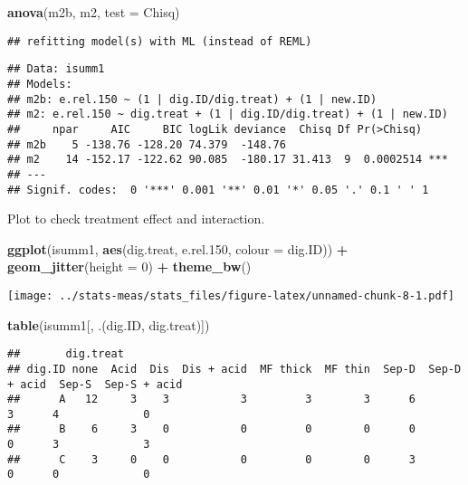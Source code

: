 \documentclass[
]{article}
\newenvironment{Shaded}{\begin{snugshade}}{\end{snugshade}}
\newcommand{\AttributeTok}[1]{\textcolor[rgb]{0.13,0.29,0.53}{#1}}
\newcommand{\DecValTok}[1]{\textcolor[rgb]{0.00,0.00,0.81}{#1}}
\newcommand{\FloatTok}[1]{\textcolor[rgb]{0.00,0.00,0.81}{#1}}
\newcommand{\FunctionTok}[1]{\textcolor[rgb]{0.13,0.29,0.53}{\textbf{#1}}}
\newcommand{\NormalTok}[1]{#1}
\newcommand{\SpecialCharTok}[1]{\textcolor[rgb]{0.81,0.36,0.00}{\textbf{#1}}}
\newcommand{\StringTok}[1]{\textcolor[rgb]{0.31,0.60,0.02}{#1}}
\begin{document}
\begin{Shaded}
\begin{Highlighting}[]
\FunctionTok{anova}\NormalTok{(m2b, m2, }\AttributeTok{test =} \StringTok{\textquotesingle{}Chisq\textquotesingle{}}\NormalTok{)}
\end{Highlighting}
\end{Shaded}

\begin{verbatim}
## refitting model(s) with ML (instead of REML)
\end{verbatim}

\begin{verbatim}
## Data: isumm1
## Models:
## m2b: e.rel.150 ~ (1 | dig.ID/dig.treat) + (1 | new.ID)
## m2: e.rel.150 ~ dig.treat + (1 | dig.ID/dig.treat) + (1 | new.ID)
##     npar     AIC     BIC logLik deviance  Chisq Df Pr(>Chisq)    
## m2b    5 -138.76 -128.20 74.379  -148.76                         
## m2    14 -152.17 -122.62 90.085  -180.17 31.413  9  0.0002514 ***
## ---
## Signif. codes:  0 '***' 0.001 '**' 0.01 '*' 0.05 '.' 0.1 ' ' 1
\end{verbatim}

Plot to check treatment effect and interaction.

\begin{Shaded}
\begin{Highlighting}[]
\FunctionTok{ggplot}\NormalTok{(isumm1, }\FunctionTok{aes}\NormalTok{(dig.treat, e.rel}\FloatTok{.150}\NormalTok{, }\AttributeTok{colour =}\NormalTok{ dig.ID)) }\SpecialCharTok{+}
  \FunctionTok{geom\_jitter}\NormalTok{(}\AttributeTok{height =} \DecValTok{0}\NormalTok{) }\SpecialCharTok{+}
  \FunctionTok{theme\_bw}\NormalTok{()}
\end{Highlighting}
\end{Shaded}

\texttt{[image: ../stats-meas/stats\_files/figure-latex/unnamed-chunk-8-1.pdf]}

\begin{Shaded}
\begin{Highlighting}[]
\FunctionTok{table}\NormalTok{(isumm1[, .(dig.ID, dig.treat)])}
\end{Highlighting}
\end{Shaded}

\begin{verbatim}
##       dig.treat
## dig.ID none  Acid  Dis  Dis + acid  MF thick  MF thin  Sep-D  Sep-D + acid  Sep-S  Sep-S + acid
##      A   12     3    3           3         3        3      6             3      4             0
##      B    6     3    0           0         0        0      0             0      3             3
##      C    3     0    0           0         0        0      3             0      0             0
\end{verbatim}
\end{document}
